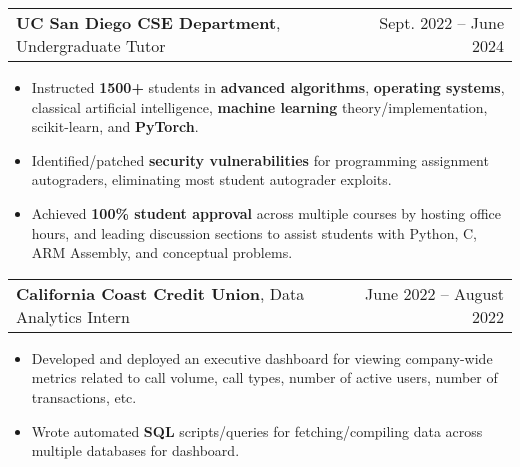 \documentclass[letterpaper, 10pt]{article}
\makeatletter
\newcommand{\resumeItem}[1]{
  \item\small{
    {#1 \vspace{-2pt}}
  }
}
\newcommand{\altSubheading}[3]{
  \vspace{4pt}\item
    \begin{tabular*}{0.97\textwidth}[t]{l@{\extracolsep{\fill}}r}
      \textbf{#1}, {#2} & #3 \\
    \end{tabular*}\vspace{-7pt}
}
\newcommand{\resumeSubSubheading}[2]{
    \item
    \begin{tabular*}{0.97\textwidth}{l@{\extracolsep{\fill}}r}
      \textit{\small#1} & \textit{\small #2} \\
    \end{tabular*}\vspace{-7pt}
}
\newcommand{\resumeSubHeadingListEnd}{\end{itemize}}
\newcommand{\resumeItemListStart}{\begin{itemize}}
\newcommand{\resumeItemListEnd}{\end{itemize}\vspace{-4pt}}
\makeatother
\begin{document}

    \altSubheading
    {UC San Diego CSE Department}{Undergraduate Tutor}{Sept. 2022 -- June 2024}
      \resumeItemListStart
        \resumeItem{Instructed \textbf{1500+} students in \textbf{advanced algorithms}, \textbf{operating systems}, classical artificial intelligence, \textbf{machine learning} theory/implementation, scikit-learn, and \textbf{PyTorch}. }
        \resumeItem{Identified/patched \textbf{security vulnerabilities} for programming assignment autograders, eliminating most student autograder exploits.}
        \resumeItem{Achieved \textbf{100\% student approval} across multiple courses by hosting office hours, and leading discussion sections to assist students with Python, C, ARM Assembly, and conceptual problems.}
      \resumeItemListEnd

    \altSubheading
      {California Coast Credit Union}{Data Analytics Intern}{June 2022 -- August 2022}
      \resumeItemListStart
        \resumeItem{Developed and deployed an executive dashboard for viewing company-wide metrics related to call volume, call types, number of active users, number of transactions, etc. }
        \resumeItem{Wrote automated \textbf{SQL} scripts/queries for fetching/compiling data across multiple databases for dashboard.}
      \resumeItemListEnd
\end{document}
